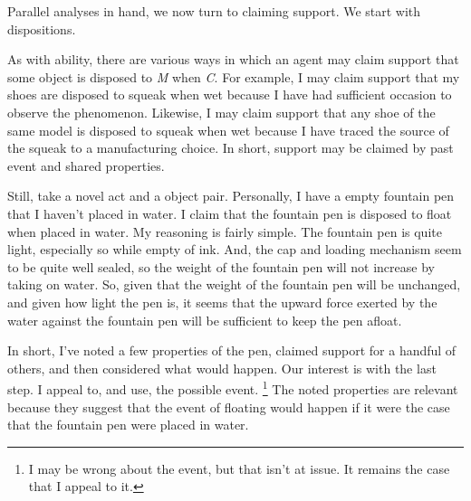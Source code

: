 \begin{note}
  Parallel analyses in hand, we now turn to claiming support.
  We start with dispositions.

  As with ability, there are various ways in which an agent may claim support that some object is disposed to \emph{M} when \emph{C}.
  For example, I may claim support that my shoes are disposed to squeak when wet because I have had sufficient occasion to observe the phenomenon.
  Likewise, I may claim support that any shoe of the same model is disposed to squeak when wet because I have traced the source of the squeak to a manufacturing choice.
  In short, support may be claimed by past event and shared properties.

  Still, take a novel act and a object pair.
  Personally, I have a empty fountain pen that I haven't placed in water.
  I claim that the fountain pen is disposed to float when placed in water.
  My reasoning is fairly simple.
  The fountain pen is quite light, especially so while empty of ink.
  And, the cap and loading mechanism seem to be quite well sealed, so the weight of the fountain pen will not increase by taking on water.
  So, given that the weight of the fountain pen will be unchanged, and given how light the pen is, it seems that the upward force exerted by the water against the fountain pen will be sufficient to keep the pen afloat.

  In short, I've noted a few properties of the pen, claimed support for a handful of others, and then considered what would happen.
  Our interest is with the last step.
  I appeal to, and use, the possible event.\nolinebreak
  \footnote{
    I may be wrong about the event, but that isn't at issue.
    It remains the case that I appeal to it.
  }
  The noted properties are relevant because they suggest that the event of floating would happen if it were the case that the fountain pen were placed in water.
\end{note}

